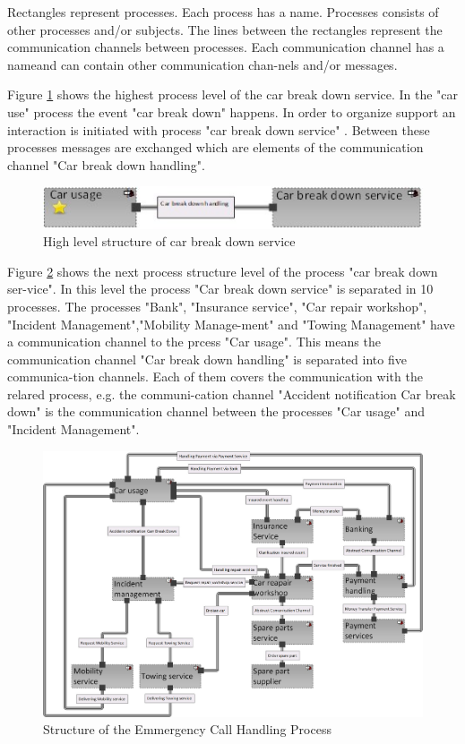 Rectangles represent processes. Each process has a name. Processes consists of other processes and/or subjects. The lines between the rectangles represent the communication channels between processes. Each communication channel has a nameand can contain other communication chan-nels and/or messages.

Figure \ref{fig:car-service-level1} shows the highest process level of the car break down service. In the "car use" process the event "car break down" happens. In order to organize support an interaction is initiated with process "car break down service" . Between these processes messages are exchanged which are elements of the communication channel "Car break down handling".\\


\begin{figure}[ph]
	\centering
	\includegraphics[width=0.7\linewidth]{Figures/Chapter5/figures-hierarchy/Car-Service-Level1.jpg}
	\caption[High level structure of car break down service]{High level structure of car break down service}
	\label{fig:car-service-level1}
\end{figure}



Figure \ref{fig:car-service-leve2} shows the next process structure level of the process "car break down ser-vice". In this level the process "Car break down service" is separated in 10 processes. The processes "Bank", "Insurance service", "Car repair workshop", "Incident Management","Mobility Manage-ment" and "Towing Management" have a communication channel to the prcess "Car usage". This means the communication channel "Car break down handling" is separated into five communica-tion channels. Each of them covers the communication with the relared process, e.g. the communi-cation channel "Accident notification Car break down" is the communication channel between the processes "Car usage" and "Incident Management".\\


\begin{figure}
	\centering
	\includegraphics[width=0.8\linewidth]{Figures/Chapter5/figures-hierarchy/Car-Service-Leve2}
	\caption[Structure of the Emmergency Call Handling Process]{Structure of the Emmergency Call Handling Process}
	\label{fig:car-service-leve2}
\end{figure}



